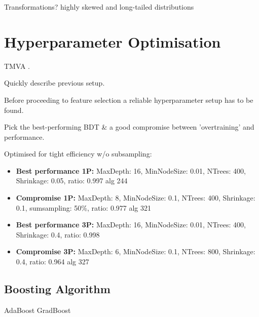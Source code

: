 Transformations? highly skewed and long-tailed distributions


\section{Hyperparameter Optimisation}
\label{sec:bdt_hyperparam}

TMVA \cite{tmva}.

Quickly describe previous setup.

Before proceeding to feature selection a reliable hyperparameter setup has to be
found.

Pick the best-performing BDT \& a good compromise between 'overtraining' and
performance.

Optimised for tight efficiency w/o subsampling:
\begin{itemize}
\item \textbf{Best performance 1P:} MaxDepth: 16, MinNodeSize: 0.01, NTrees:
  400, Shrinkage: 0.05, ratio: 0.997 \textrightarrow alg 244
\item \textbf{Compromise 1P:} MaxDepth: 8, MinNodeSize: 0.1, NTrees: 400,
  Shrinkage: 0.1, sumsampling: 50\%, ratio: 0.977 \textrightarrow alg 321
\item \textbf{Best performance 3P:} MaxDepth: 16, MinNodeSize: 0.01, NTrees:
  400, Shrinkage: 0.4, ratio: 0.998 
\item \textbf{Compromise 3P:} MaxDepth: 6, MinNodeSize: 0.1, NTrees: 800,
  Shrinkage: 0.4, ratio: 0.964 \textrightarrow alg 327
\end{itemize}

\subsection{Boosting Algorithm}
\label{sec:bdt_boosting}
AdaBoost \textrightarrow GradBoost

